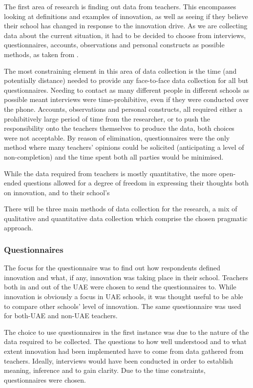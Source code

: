 The first area of research is finding out data from teachers. This encompasses looking at definitions and examples of innovation, as well as seeing if they believe their school has changed in response to the innovation drive. As we are collecting data about the current situation, it had to be decided to choose from interviews, questionnaires, accounts, observations and personal constructs as possible methods, as taken from \citet{Cohen2005}.

The most constraining element in this area of data collection is the time (and potentially distance) needed to provide any face-to-face data collection for all but questionnaires. Needing to contact as many different people in different schools as possible meant interviews were time-prohibitive, even if they were conducted over the phone. Accounts, observations and personal constructs, all required either a prohibitively large period of time from the researcher, or to push the responsibility onto the teachers themselves to produce the data, both choices were not acceptable. By reason of elimination, questionnaires were the only method where many teachers' opinions could be solicited (anticipating a level of non-completion) and the time spent both all parties would be minimised. 

While the data required from teachers is mostly quantitative, the more open-ended questions allowed for a degree of freedom in expressing their thoughts both on innovation, and to their school's 

There will be three main methods of data collection for the research, a mix of qualitative and quantitative data collection which comprise the chosen pragmatic approach.

\subsubsection{Questionnaires}

The focus for the questionnaire was to find out how respondents defined innovation and what, if any, innovation was taking place in their school. Teachers both in and out of the UAE were chosen to send the questionnaires to. While innovation is obviously a focus in UAE schools, it was thought useful to be able to compare other schools' level of innovation. The same questionnaire was used for both-UAE and non-UAE teachers. 

The choice to use questionnaires in the first instance was due to the nature of the data required to be collected. The questions to how well understood and to what extent innovation had been implemented have to come from data gathered from teachers. Ideally, interviews would have been conducted in order to establish meaning, inference and to gain clarity. Due to the time constraints, questionnaires were chosen. 

